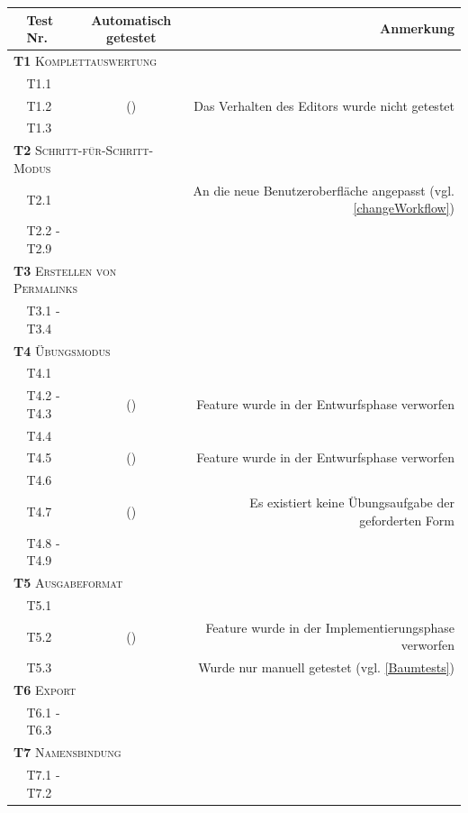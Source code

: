 \documentclass[parskip=full,11pt,openany]{scrreprt}
\newcommand{\cmark}{\ding{51}}%
\newcommand{\xmark}{\ding{55}}%
\begin{document}
\begin{table}[h]
	\centering
	\begin{tabular}{@{}ll|c|r@{}}
		\toprule
		&\textbf{Test Nr.} & \makecell{\textbf{Automatisch}\\\textbf{getestet}} &\textbf{Anmerkung} \\ 
		\midrule
		\multicolumn{3}{l|}{\small \textsc{\textbf{T1} Komplettauswertung}} \\ 
		&T1.1 & \cmark & \\
		&T1.2 & (\cmark) & Das Verhalten des Editors wurde nicht getestet \\
		&T1.3 & \cmark & \\ 
		\multicolumn{3}{l|}{\small \textsc{\textbf{T2} Schritt-für-Schritt-Modus}}\\ 
		&T2.1 & \cmark & An die neue Benutzeroberfläche angepasst (vgl. \ref{changeWorkflow}) \\
		&T2.2 - T2.9 & \cmark & \\
		\multicolumn{3}{l|}{\small \textsc{\textbf{T3} Erstellen von Permalinks}}\\ 	
		&T3.1 - T3.4 & \cmark & \\
		\multicolumn{3}{l|}{\small \textsc{\textbf{T4} Übungsmodus}}\\ 
		&T4.1 & \cmark & \\
		&T4.2 - T4.3 & (\xmark) & Feature wurde in der Entwurfsphase verworfen \\
		&T4.4 & \cmark & \\
		&T4.5 & (\xmark) & Feature wurde in der Entwurfsphase verworfen \\
		&T4.6 & \cmark & \\
		&T4.7 & (\xmark) & Es existiert keine Übungsaufgabe der geforderten Form \\
		&T4.8 - T4.9 & \cmark & \\
		\multicolumn{3}{l|}{\small \textsc{\textbf{T5} Ausgabeformat}}\\ 
		&T5.1 & \cmark & \\
		&T5.2 & (\xmark) & Feature wurde in der Implementierungsphase verworfen\\
		&T5.3 & \xmark & Wurde nur manuell getestet (vgl. \ref{Baumtests})\\
		\multicolumn{2}{l|}{\small \textsc{\textbf{T6} Export}} & &\\ 
		&T6.1 - T6.3 & \cmark & \\
		\multicolumn{3}{l|}{\small \textsc{\textbf{T7} Namensbindung}}\\ 
		&T7.1 - T7.2 & \cmark & \\

\end{tabular}
\end{table}
\end{document}
